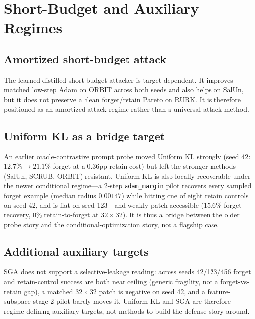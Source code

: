\documentclass[11pt]{article}
\begin{document}




\section{Short-Budget and Auxiliary Regimes}
\subsection{Amortized short-budget attack}
The learned distilled short-budget attacker is target-dependent. It improves matched low-step Adam on ORBIT across both seeds and also helps on SalUn, but it does not preserve a clean forget/retain Pareto on RURK. It is therefore positioned as an amortized attack regime rather than a universal attack method.



\subsection{Uniform KL as a bridge target}
An earlier oracle-contrastive prompt probe moved Uniform KL strongly (seed 42: $12.7\%\!\to\!21.1\%$ forget at a $0.36$pp retain cost) but left the stronger methods (SalUn, SCRUB, ORBIT) resistant. Uniform KL is also locally recoverable under the newer conditional regime---a 2-step \texttt{adam\_margin} pilot recovers every sampled forget example (median radius $0.00147$) while hitting one of eight retain controls on seed 42, and is flat on seed 123---and weakly patch-accessible ($15.6\%$ forget recovery, $0\%$ retain-to-forget at $32\times32$). It is thus a bridge between the older probe story and the conditional-optimization story, not a flagship case.

\subsection{Additional auxiliary targets}
SGA does not support a selective-leakage reading: across seeds 42/123/456 forget and retain-control success are both near ceiling (generic fragility, not a forget-vs-retain gap), a matched $32\times32$ patch is negative on seed 42, and a feature-subspace stage-2 pilot barely moves it. Uniform KL and SGA are therefore regime-defining auxiliary targets, not methods to build the defense story around.


\end{document}

